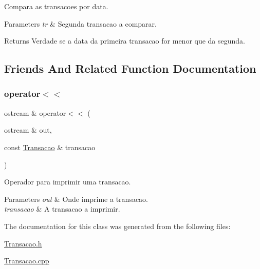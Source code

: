 Compara as transacoes por data. 


\begin{DoxyParams}{Parameters}
{\em tr} & Segunda transacao a comparar.\\
\hline
\end{DoxyParams}
\begin{DoxyReturn}{Returns}
Verdade se a data da primeira transacao for menor que da segunda. 
\end{DoxyReturn}


\subsection{Friends And Related Function Documentation}
\hypertarget{class_transacao_a1b84445ef2674a7af30a1d313844766c}{}\label{class_transacao_a1b84445ef2674a7af30a1d313844766c} 
\subsubsection{\texorpdfstring{operator$<$$<$}{operator<<}}
{\footnotesize\ttfamily ostream \& operator$<$$<$ (\begin{DoxyParamCaption}\item[{ostream \&}]{out,  }\item[{const \hyperlink{class_transacao}{Transacao} \&}]{transacao }\end{DoxyParamCaption})\hspace{0.3cm}{\ttfamily [friend]}}



Operador para imprimir uma transacao. 


\begin{DoxyParams}{Parameters}
{\em out} & Onde imprime a transacao. \\
\hline
{\em transacao} & A transacao a imprimir. \\
\hline
\end{DoxyParams}


The documentation for this class was generated from the following files\+:\begin{DoxyCompactItemize}
\item 
\hyperlink{_transacao_8h}{Transacao.\+h}\item 
\hyperlink{_transacao_8cpp}{Transacao.\+cpp}\end{DoxyCompactItemize}

